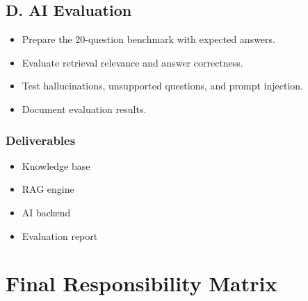 \documentclass[11pt,a4paper]{article}
\begin{document}
\subsection*{D. AI Evaluation}
\begin{itemize}
  \item Prepare the 20-question benchmark with expected answers.
  \item Evaluate retrieval relevance and answer correctness.
  \item Test hallucinations, unsupported questions, and prompt injection.
  \item Document evaluation results.
\end{itemize}

\subsubsection*{Deliverables}
\begin{itemize}
  \item Knowledge base
  \item RAG engine
  \item AI backend
  \item Evaluation report
\end{itemize}

\newpage
\section{Final Responsibility Matrix}
\end{document}
